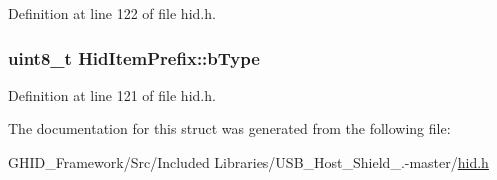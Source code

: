 \-Definition at line 122 of file hid.\-h.

\hypertarget{struct_hid_item_prefix_a16874c73fdb809e4c46407ca83684927}{
\subsubsection[{b\-Type}]{\setlength{\rightskip}{0pt plus 5cm}uint8\-\_\-t {\bf \-Hid\-Item\-Prefix\-::b\-Type}}}\label{struct_hid_item_prefix_a16874c73fdb809e4c46407ca83684927}


\-Definition at line 121 of file hid.\-h.



\-The documentation for this struct was generated from the following file\-:\begin{DoxyCompactItemize}
\item 
\-G\-H\-I\-D\-\_\-\-Framework/\-Src/\-Included Libraries/\-U\-S\-B\-\_\-\-Host\-\_\-\-Shield\-\_.-\/master/\hyperlink{hid_8h}{hid.\-h}\end{DoxyCompactItemize}
